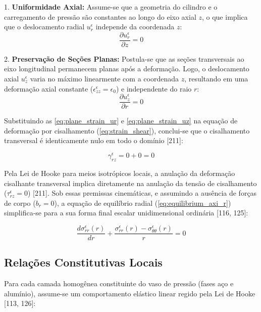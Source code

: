 1. \textbf{Uniformidade Axial:} Assume-se que a geometria do cilindro e o carregamento de pressão são constantes ao longo do eixo axial $z$, o que implica que o deslocamento radial $u_r^\epsilon$ independe da coordenada $z$:
\begin{equation}
  \frac{\partial u_r^\epsilon}{\partial z} = 0
  \label{eq:plane_strain_ur}
\end{equation}

2. \textbf{Preservação de Seções Planas:} Postula-se que as seções transversais ao eixo longitudinal permanecem planas após a deformação. Logo, o deslocamento axial $u_z^\epsilon$ varia no máximo linearmente com a coordenada $z$, resultando em uma deformação axial constante ($\epsilon_{zz}^\epsilon = \epsilon_0$) e independente do raio $r$:
\begin{equation}
  \frac{\partial u_z^\epsilon}{\partial r} = 0
  \label{eq:plane_strain_uz}
\end{equation}

Substituindo as \eqref{eq:plane_strain_ur} e \eqref{eq:plane_strain_uz} na equação de deformação por cisalhamento (\eqref{eq:strain_shear}), conclui-se que o cisalhamento transversal é identicamente nulo em todo o domínio [211]:

\begin{equation}
  \gamma_{rz}^\epsilon = 0 + 0 = 0
  \label{eq:shear_zero}
\end{equation}

Pela Lei de Hooke para meios isotrópicos locais, a anulação da deformação cisalhante transversal implica diretamente na anulação da tensão de cisalhamento ($\tau_{rz}^\epsilon = 0$) [211]. Sob essas premissas cinemáticas, e assumindo a ausência de forças de corpo ($b_r = 0$), a equação de equilíbrio radial (\eqref{eq:equilibrium_axi_r}) simplifica-se para a sua forma final escalar unidimensional ordinária [116, 125]:

\begin{equation}
  \frac{d \sigma_{rr}^\epsilon(r)}{d r} + \frac{\sigma_{rr}^\epsilon(r) - \sigma_{\theta\theta}^\epsilon(r)}{r} = 0
  \label{eq:equilibrium_radial_1d}
\end{equation}

\subsection{Relações Constitutivas Locais}

Para cada camada homogênea constituinte do vaso de pressão (fases aço e alumínio), assume-se um comportamento elástico linear regido pela Lei de Hooke [113, 126]:

